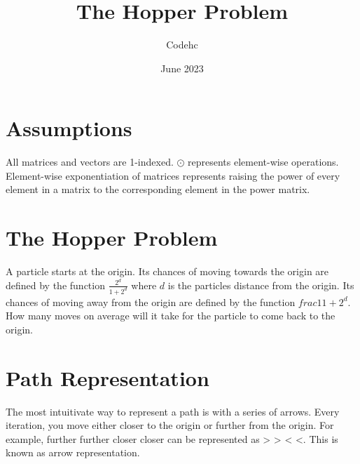 \documentclass[letterpaper, 12pt]{report}
\title{The Hopper Problem}
\author{Codehc}
\date{June 2023}
\begin{document}
\maketitle

\section{Assumptions}

All matrices and vectors are 1-indexed. $\odot$ represents element-wise operations. Element-wise exponentiation of matrices represents raising the power of every element in a matrix to the corresponding element in the power matrix.

\section{The Hopper Problem}

A particle starts at the origin. Its chances of moving towards the origin are defined by the function $\frac{2^d}{1+2^d}$ where $d$ is the particles distance from the origin. Its chances of moving away from the origin are defined by the function $frac{1}{1+2^d}$. How many moves on average will it take for the particle to come back to the origin. 

\section{Path Representation}

The most intuitivate way to represent a path is with a series of arrows. Every iteration, you move either closer to the origin or further from the origin. For example, further further closer closer can be represented as > > < <. This is known as arrow representation.
\end{document}
